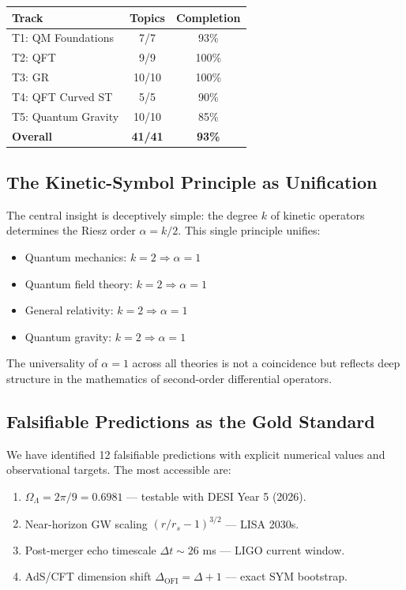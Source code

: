 \documentclass[12pt,a4paper]{article}
\theoremstyle{definition}
\newcommand{\OFI}{\text{OFI}}
\begin{document}
\begin{center}
\begin{tabular}{|l|c|c|}
\hline
\textbf{Track} & \textbf{Topics} & \textbf{Completion} \\
\hline
T1: QM Foundations & 7/7 & 93\% \\
T2: QFT & 9/9 & 100\% \\
T3: GR & 10/10 & 100\% \\
T4: QFT Curved ST & 5/5 & 90\% \\
T5: Quantum Gravity & 10/10 & 85\% \\
\hline
\textbf{Overall} & \textbf{41/41} & \textbf{93\%} \\
\hline
\end{tabular}
\end{center}

\subsection{The Kinetic-Symbol Principle as Unification}

The central insight is deceptively simple: the degree $k$ of kinetic operators determines the Riesz order $\alpha = k/2$. This single principle unifies:
\begin{itemize}
\item Quantum mechanics: $k=2 \Rightarrow \alpha = 1$
\item Quantum field theory: $k=2 \Rightarrow \alpha = 1$
\item General relativity: $k=2 \Rightarrow \alpha = 1$
\item Quantum gravity: $k=2 \Rightarrow \alpha = 1$
\end{itemize}

The universality of $\alpha = 1$ across all theories is not a coincidence but reflects deep structure in the mathematics of second-order differential operators.

\subsection{Falsifiable Predictions as the Gold Standard}

We have identified 12 falsifiable predictions with explicit numerical values and observational targets. The most accessible are:

\begin{enumerate}
\item $\Omega_\Lambda = 2\pi/9 = 0.6981$ — testable with DESI Year 5 (2026).
\item Near-horizon GW scaling $(r/r_s - 1)^{3/2}$ — LISA 2030s.
\item Post-merger echo timescale $\Delta t \sim 26$ ms — LIGO current window.
\item AdS/CFT dimension shift $\Delta_{\OFI} = \Delta + 1$ — exact SYM bootstrap.
\end{enumerate}
\end{document}

